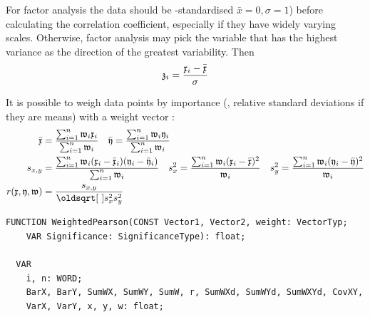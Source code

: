 \begin{refsection}
For factor analysis the data should be -standardised \( \bar{x} = 0, \sigma = 1 \)) before calculating the correlation coefficient, especially if they have widely varying scales. Otherwise, factor analysis may pick the variable that has the highest variance as the direction of the greatest variability. Then
\begin{equation}
  \mathfrak{z}_i = \frac{\mathfrak{x}_i - \bar{\mathfrak{x}}}{\sigma}
\end{equation}

It is possible to weigh data points by importance (, relative standard deviations if they are means) with a weight vector :
\begin{align}
  \bar{\AbsVec{x}}  & = \frac{\sum_{i=1}^n{\AbsVec{w}_i \AbsVec{x}_i}}{\sum_{i=1}^n{\AbsVec{w}_i}} \quad \bar{\AbsVec{y}}    = \frac{\sum_{i=1}^n{\AbsVec{w}_i \AbsVec{y}_i}}{\sum_{i=1}^n{\AbsVec{w}_i}} \\
  s_{x,y}           & = \frac{\sum_{i=1}^n{\AbsVec{w}_i (\AbsVec{x}_i - \bar{\AbsVec{x}}_i) (\AbsVec{y}_i - \bar{\AbsVec{y}}_i)}}{\sum_{i=1}^n{\AbsVec{w}_i}} \quad
                  s_x^2 = \frac{\sum_{i=1}^n{\AbsVec{w}_i (\AbsVec{x}_i - \bar{\AbsVec{x}})^2}}{\AbsVec{w}_i} \quad
                  s_y^2 = \frac{\sum_{i=1}^n{\AbsVec{w}_i (\AbsVec{y}_i - \bar{\AbsVec{y}})^2}}{\AbsVec{w}_i} \\
  r(\AbsVec{x,y,w}) & = \frac{s_{x,y}}{\sqrt{s_x^2 s_y^2}}
\end{align}

\begin{lstlisting}[caption=Weighted \Name{Pearson} product moment correlation]
  FUNCTION WeightedPearson(CONST Vector1, Vector2, weight: VectorTyp;
    VAR Significance: SignificanceType): float;

  VAR
    i, n: WORD;
    BarX, BarY, SumWX, SumWY, SumW, r, SumWXd, SumWYd, SumWXYd, CovXY,
    VarX, VarY, x, y, w: float;


\end{lstlisting}
\end{refsection}
